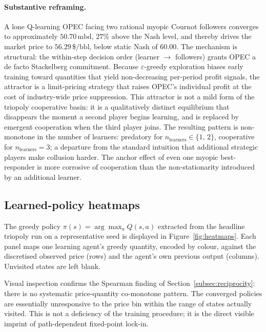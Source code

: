 \paragraph{Substantive reframing.}
A lone Q-learning OPEC facing two rational myopic Cournot
followers converges to approximately $50.70\,\text{mbd}$, $27\%$
above the Nash level, and thereby drives the market price to
$56.29\,\$\text{/bbl}$, below static Nash of $60.00$. The
mechanism is structural: the within-step decision order (learner
$\rightarrow$ followers) grants OPEC a de facto Stackelberg
commitment. Because $\varepsilon$-greedy exploration biases early
training toward quantities that yield non-decreasing per-period
profit signals, the attractor is a limit-pricing strategy
that raises OPEC's individual profit at the cost of
industry-wide price suppression. This attractor is not a mild
form of the triopoly cooperative basin: it is a qualitatively
distinct equilibrium that disappears the moment a second player
begins learning, and is replaced by emergent cooperation when
the third player joins. The resulting pattern is
non-monotone in the number of learners: predatory for
$n_{\text{learners}} \in \{1,\,2\}$, cooperative for
$n_{\text{learners}} = 3$; a departure from the standard
intuition that additional strategic players make collusion
harder. The anchor effect of even one myopic best-responder is
more corrosive of cooperation than the non-stationarity
introduced by an additional learner.

\subsection{Learned-policy heatmaps}
\label{subsec:heatmaps}

The greedy policy $\pi(s) = \arg\max_a Q(s,a)$ extracted from
the headline triopoly run on a representative seed is displayed
in Figure~\ref{fig:heatmaps}. Each panel maps one learning
agent's greedy quantity, encoded by colour, against the
discretised observed price (rows) and the agent's own previous
output (columns). Unvisited states are left blank.

Visual inspection confirms the Spearman finding of
Section~\ref{subsec:reciprocity}: there is no systematic
price-quantity co-monotone pattern. The converged policies are
essentially unresponsive to the price bin within the range of
states actually visited. This is not a deficiency of the
training procedure; it is the direct visible imprint of
path-dependent fixed-point lock-in.

